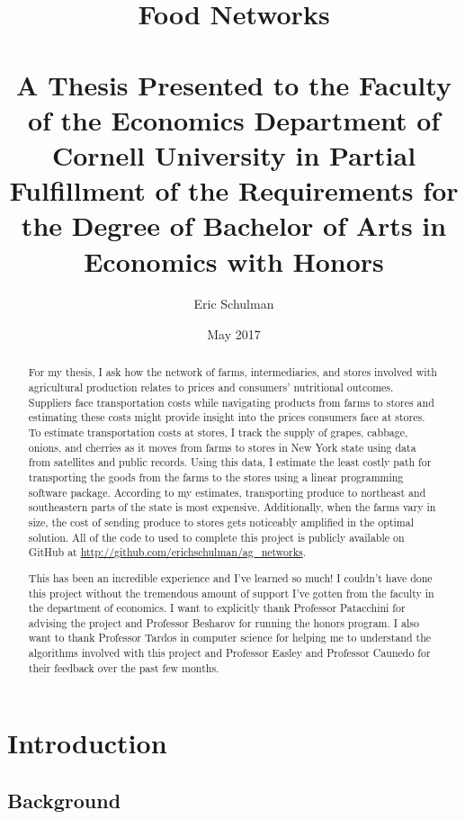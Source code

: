 \documentclass{report}
\title{Food Networks \\~\\ \normalsize A Thesis Presented to the Faculty of the Economics Department of Cornell University in Partial Fulfillment of the Requirements for the Degree of Bachelor of Arts in Economics with Honors}
\author{Eric Schulman}
\date{May 2017}
\begin{document}
\maketitle

\pagebreak

\begin{abstract}
For my thesis, I ask how the network of farms, intermediaries, and stores involved with agricultural production relates to prices and consumers' nutritional outcomes. Suppliers face transportation costs while navigating products from farms to stores and estimating these costs might provide insight into the prices consumers face at stores. To estimate transportation costs at stores, I track the supply of grapes, cabbage, onions, and cherries as it moves from farms to stores in New York state using data from satellites and public records. Using this data, I estimate the least costly path for transporting the goods from the farms to the stores using a linear programming software package. According to my estimates, transporting produce to northeast and southeastern parts of the state is most expensive. Additionally, when the farms vary in size, the cost of sending produce to stores gets noticeably amplified in the optimal solution. All of the code to used to complete this project is publicly available on GitHub at \url{http://github.com/erichschulman/ag_networks}. 
\end{abstract}

\pagebreak

\renewcommand{\abstractname}{Acknowledgments}
\begin{abstract}
This has been an incredible experience and I've learned so much! I couldn't have done this project without the tremendous amount of support I've gotten from the faculty in the department of economics. I want to explicitly thank Professor Patacchini for advising the project and Professor Besharov for running the honors program. I also want to thank Professor Tardos in computer science for helping me to understand the algorithms involved with this project and Professor Easley and Professor Caunedo for their feedback over the past few months. 
\end{abstract}

\tableofcontents

\chapter{Introduction}
\section{Background}
\end{document}
